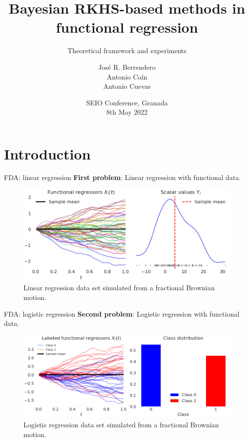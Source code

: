 \documentclass[10pt, english, professionalfonts]{beamer}
\title{Bayesian RKHS-based methods in functional regression}
\subtitle{Theoretical framework and experiments}
\date{SEIO Conference, Granada\\ 8th May 2022\\}
\author{José R. Berrendero \\ Antonio Coín  \\ Antonio Cuevas\\}
\institute{Universidad Autónoma de Madrid \\ \textit{Departamento de Matemáticas}}
\newcommand\maroon[1]{\color{mLightBrown}#1\color{mDarkTeal}}
\begin{document}
\maketitle


\section{Introduction}

\begin{frame}{FDA: linear regression}
  \textbf{First problem}: \maroon{Linear } regression with functional data.
  \vspace{1em}

\begin{figure}
    \includegraphics[width=\textwidth]{img/data_lin}
    \caption{Linear regression data set simulated from a fractional Brownian motion.}
  \end{figure}
  \vspace{-1em}
\end{frame}
\begin{frame}{FDA: logistic regression}
  \textbf{Second problem}: \maroon{Logistic } regression with functional data.
\vspace{1em}

\begin{figure}
    \includegraphics[width=\textwidth]{img/data_log}
    \caption{Logistic regression data set simulated from a fractional Brownian motion.}
  \end{figure}
  \vspace{-1em}
\end{frame}
\end{document}
